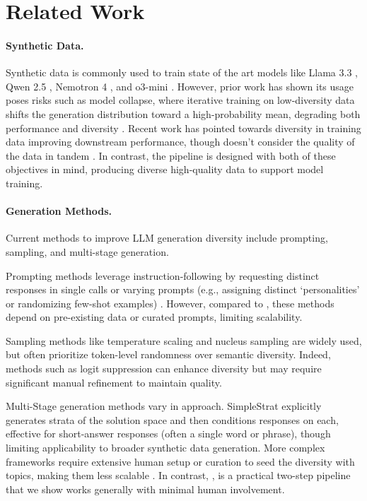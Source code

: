\section{Related Work}
\label{related_work}

\paragraph{Synthetic Data.} Synthetic data is commonly used to train state of the art models like Llama 3.3 \cite{llama2024llama}, Qwen 2.5 \cite{qwen2025qwen25technicalreport}, Nemotron 4 \cite{nvidia2024nemotron4340btechnicalreport}, and o3-mini \cite{guan2025deliberativealignmentreasoningenables}. However, prior work has shown its usage poses risks such as model collapse, where iterative training on low-diversity data shifts the generation distribution toward a high-probability mean, degrading both performance and diversity \cite{Shumailov2024, shimabucoro2024llmseellmdo, guo2023curious}. Recent work has pointed towards diversity in training data improving downstream performance, though doesn't consider the quality of the data in tandem \cite{chen2024diversitysyntheticdataimpact}. In contrast, the \Sys{} pipeline is designed with both of these objectives in mind, producing diverse high-quality data to support model training.

\paragraph{Generation Methods.} Current methods to improve LLM generation diversity include prompting, sampling, and multi-stage generation.

Prompting methods leverage instruction-following by requesting distinct responses in single calls or varying prompts (e.g., assigning distinct `personalities' or randomizing few-shot examples) \cite{zhang-etal-2024-improving-diversity, naik2023diversity, frohling2024personas, chen2024diversitysyntheticdataimpact, li2022making}. However, compared to \Sys{}, these methods depend on pre-existing data or curated prompts, limiting scalability.

Sampling methods like temperature scaling and nucleus sampling \cite{Holtzman2020} are widely used, but often prioritize token-level randomness over semantic diversity. Indeed, methods such as logit suppression \cite{chung2023increasing} can enhance diversity but may require significant manual refinement to maintain quality.

Multi-Stage generation methods vary in approach. SimpleStrat \cite{wong2024simplestratdiversifyinglanguagemodel} explicitly generates strata of the solution space and then conditions responses on each, effective for short-answer responses (often a single word or phrase), though limiting applicability to broader synthetic data generation. More complex frameworks require extensive human setup or curation to seed the diversity with topics, making them less scalable \cite{lambert2024self, li2024syntheticdataalmostscratch, li2023textbooksneediiphi15}. In contrast, \Sys{}, is a practical two-step pipeline that we show works generally with minimal human involvement.

